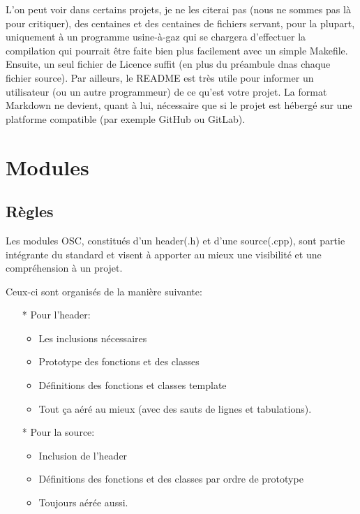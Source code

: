 \documentclass[a4paper,12pt]{report}
\begin{document}
L'on peut voir dans certains projets, je ne les citerai pas (nous ne 
sommes pas là pour critiquer), des centaines et des centaines de 
fichiers servant, pour la plupart, uniquement à un programme usine-à-gaz 
qui se chargera d'effectuer la compilation qui pourrait être faite bien 
plus facilement avec un simple Makefile. Ensuite, un seul fichier de 
Licence suffit (en plus du préambule dnas chaque fichier source). Par 
ailleurs, le README est très utile pour informer un utilisateur (ou un 
autre programmeur) de ce qu'est votre projet. La format Markdown ne 
devient, quant à lui, nécessaire que si le projet est hébergé sur une 
platforme compatible (par exemple GitHub ou GitLab).


\section{Modules}
\subsection{Règles}
Les modules OSC, constitués d'un header(.h) et d'une source(.cpp), sont 
partie intégrante du standard et visent à apporter au mieux une 
visibilité et une compréhension à un projet.\newline

Ceux-ci sont organisés de la manière suivante: \newline

\begin{itemize}
    \item[*] Pour l'header: 
             \begin{itemize}
                \item Les inclusions nécessaires
                \item Prototype des fonctions et des classes
                \item Définitions des fonctions et classes template
                \item Tout ça aéré au mieux (avec des sauts de lignes et 
                      tabulations).
             \end{itemize}
    \item[*] Pour la source: 
             \begin{itemize}
                \item Inclusion de l'header
                \item Définitions des fonctions et des classes par ordre 
                      de prototype
                \item Toujours aérée aussi.
             \end{itemize}
\end{itemize}
\end{document}
